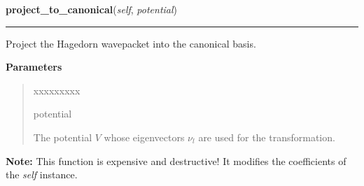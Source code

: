 \hspace{.8\funcindent}\begin{boxedminipage}{\funcwidth}

    \raggedright \textbf{project\_to\_canonical}(\textit{self}, \textit{potential})

    \vspace{-1.5ex}

    \rule{\textwidth}{0.5\fboxrule}
\setlength{\parskip}{2ex}
    Project the Hagedorn wavepacket into the canonical basis.

\setlength{\parskip}{1ex}
      \textbf{Parameters}
      \vspace{-1ex}

      \begin{quote}
        \begin{Ventry}{xxxxxxxxx}

          \item[potential]

          The potential $V$ whose eigenvectors $\nu_l$ are used for the
          transformation.

        \end{Ventry}

      \end{quote}

\textbf{Note:} This function is expensive and destructive! It modifies the coefficients of
the \textit{self} instance.



    \end{boxedminipage}

    \label{HagedornMultiWavepacket:HagedornMultiWavepacket:project_to_eigen}

    \vspace{0.5ex}

